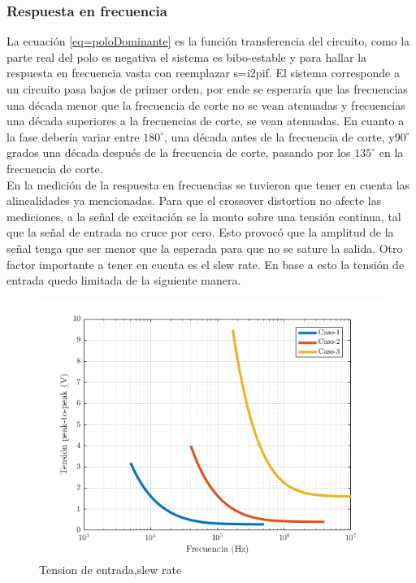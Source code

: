 \documentclass[../../main.tex]{subfiles}
\begin{document}
\subsubsection{Respuesta en frecuencia}

La ecuación \ref{eq=poloDominante} es la función transferencia del circuito, como la parte real del polo es negativa el sistema es bibo-estable y para hallar la respuesta en frecuencia vasta con reemplazar s=i2pif. El sistema corresponde a un circuito pasa bajos de primer orden, por ende se esperaría que las frecuencias una década menor que la frecuencia de corte no se vean atenuadas y frecuencias una década superiores a la frecuencias de corte, se vean atenuadas. En cuanto a la fase debería variar entre $180^{\circ}$, una década antes de la frecuencia de corte, y$90^{\circ}$ grados una década después de la frecuencia de corte, pasando por los $135^{\circ}$ en la frecuencia de corte.
\\
En la medición de la respuesta en frecuencias se tuvieron que tener en cuenta las alinealidades ya mencionadas. Para que el crossover distortion no afecte las mediciones, a la señal de excitación se la monto sobre una tensión continua, tal que la señal de entrada no cruce por cero. Esto provocó que la amplitud de la señal tenga que ser menor que la esperada para que no se sature la salida. Otro factor importante a tener en cuenta es el slew rate. En base a esto la tensión de entrada quedo limitada de la siguiente manera.

\begin{figure}[H]
\centering
\includegraphics[width=1\textwidth]{slew-rate-inv}
\caption{Tension de entrada,slew rate} \label{fig=srInv}
\end{figure}
\end{document}
